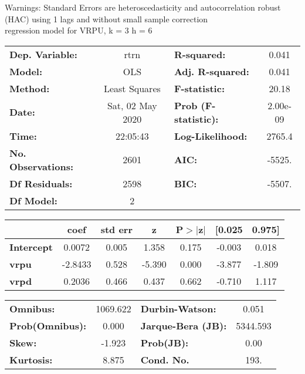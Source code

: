 Warnings: \newline
 [1] Standard Errors are heteroscedasticity and autocorrelation robust (HAC) using 1 lags and without small sample correction\\ 

regression model for VRPU, k = 3 h = 6\begin{center}
\begin{tabular}{lclc}
\toprule
\textbf{Dep. Variable:}    &       rtrn       & \textbf{  R-squared:         } &     0.041   \\
\textbf{Model:}            &       OLS        & \textbf{  Adj. R-squared:    } &     0.041   \\
\textbf{Method:}           &  Least Squares   & \textbf{  F-statistic:       } &     20.18   \\
\textbf{Date:}             & Sat, 02 May 2020 & \textbf{  Prob (F-statistic):} &  2.00e-09   \\
\textbf{Time:}             &     22:05:43     & \textbf{  Log-Likelihood:    } &    2765.4   \\
\textbf{No. Observations:} &        2601      & \textbf{  AIC:               } &    -5525.   \\
\textbf{Df Residuals:}     &        2598      & \textbf{  BIC:               } &    -5507.   \\
\textbf{Df Model:}         &           2      & \textbf{                     } &             \\
\bottomrule
\end{tabular}
\begin{tabular}{lcccccc}
                   & \textbf{coef} & \textbf{std err} & \textbf{z} & \textbf{P$> |$z$|$} & \textbf{[0.025} & \textbf{0.975]}  \\
\midrule
\textbf{Intercept} &       0.0072  &        0.005     &     1.358  &         0.175        &       -0.003    &        0.018     \\
\textbf{vrpu}      &      -2.8433  &        0.528     &    -5.390  &         0.000        &       -3.877    &       -1.809     \\
\textbf{vrpd}      &       0.2036  &        0.466     &     0.437  &         0.662        &       -0.710    &        1.117     \\
\bottomrule
\end{tabular}
\begin{tabular}{lclc}
\textbf{Omnibus:}       & 1069.622 & \textbf{  Durbin-Watson:     } &    0.051  \\
\textbf{Prob(Omnibus):} &   0.000  & \textbf{  Jarque-Bera (JB):  } & 5344.593  \\
\textbf{Skew:}          &  -1.923  & \textbf{  Prob(JB):          } &     0.00  \\
\textbf{Kurtosis:}      &   8.875  & \textbf{  Cond. No.          } &     193.  \\
\bottomrule
\end{tabular}
\end{center}

